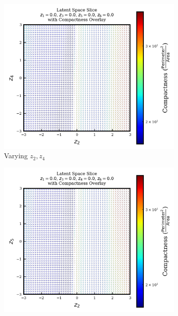 \documentclass{article}
\begin{document}
\begin{figure}[H]
    \begin{subfigure}{0.3\textwidth}
        \includegraphics[width=\linewidth]{figures/VAEmodels/model5/varying_z2_z4_fixed_z1=0.0_z3=0.0_z5=0.0_z6=0.0.png}
        \caption{Varying $z_2, z_4$}
    \end{subfigure}
    \hfill
    \begin{subfigure}{0.3\textwidth}
        \includegraphics[width=\linewidth]{figures/VAEmodels/model5/varying_z2_z5_fixed_z1=0.0_z3=0.0_z4=0.0_z6=0.0.png}

\end{subfigure}
\end{figure}
\end{document}
